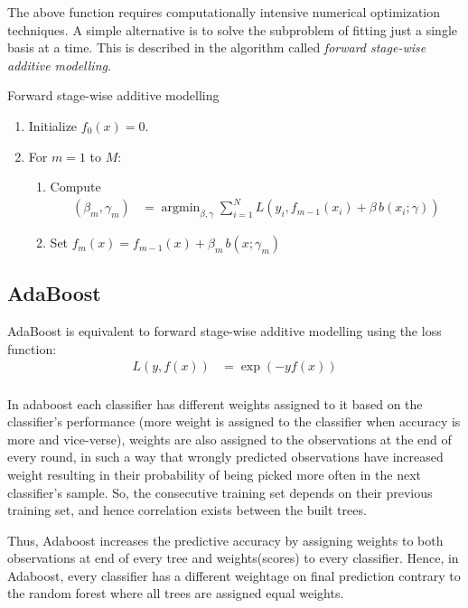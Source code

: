 \documentclass{article}
\DeclareMathOperator*{\argmin}{argmin}
\begin{document}
The above function requires computationally intensive numerical optimization techniques. A simple alternative is to solve the subproblem of fitting just a single basis at a time. This is described in the algorithm called  \emph{forward stage-wise additive modelling}.
\begin{algorithm}[h]
\caption{Forward stage-wise additive modelling}
\begin{enumerate}
\item Initialize $f_0(x) = 0$.
\item For $m = 1$ to $M$:
	\begin{enumerate}
	\item Compute
		\begin{align*}
		(\beta_m,\gamma_m) &= \argmin_{\beta,\gamma} \sum_{i=1}^{N} L(y_i, f_{m-1}(x_i) + \beta \, b(x_i;\gamma))
		\end{align*}
	\item Set $f_m(x) = f_{m-1}(x) + \beta_m \, b(x;\gamma_m)$
	\end{enumerate}
\end{enumerate}
\end{algorithm}

\subsection{AdaBoost}
AdaBoost is equivalent to forward stage-wise additive modelling using the loss function:
\begin{align*}
L(y, f(x)) &= \exp{(-y f(x))} \\
\end{align*}

In adaboost each classifier has different weights assigned to it based on the classifier's performance (more weight is assigned to the classifier when accuracy is more and vice-verse), weights are also assigned to the observations at the end of every round, in such a way that wrongly predicted observations have increased weight resulting in their probability of being picked more often in the next classifier's sample. So, the consecutive training set depends on their previous training set, and hence correlation exists between the built trees.

Thus, Adaboost increases the predictive accuracy by assigning weights to both observations at end of every tree and weights(scores) to every classifier. Hence, in Adaboost, every classifier has a different weightage on final prediction contrary to the random forest where all trees are assigned equal weights.
\end{document}
